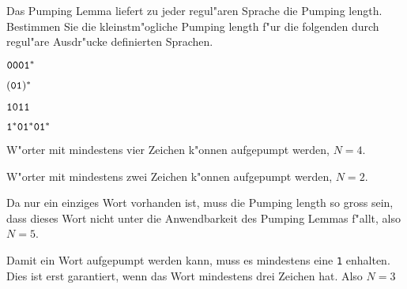 Das Pumping Lemma liefert zu jeder regul"aren Sprache die Pumping length.
Bestimmen Sie die kleinstm"ogliche Pumping length f"ur die folgenden
durch regul"are Ausdr"ucke definierten Sprachen.
\begin{teilaufgaben}
\item ${\tt 0001}^*$
\item $({\tt 01})^*$
\item ${\tt 1011}$
\item ${\tt 1}^*{\tt 01}^*{\tt 01}^*$
\end{teilaufgaben}

\begin{loesung}
\begin{teilaufgaben}
\item W"orter mit mindestens vier Zeichen k"onnen aufgepumpt werden,
$N=4$.
\item W"orter mit mindestens zwei Zeichen k"onnen aufgepumpt werden,
$N=2$.
\item Da nur ein einziges Wort vorhanden ist, muss die Pumping length
so gross sein, dass dieses Wort nicht unter die Anwendbarkeit des
Pumping Lemmas f"allt, also $N=5$.
\item Damit ein Wort aufgepumpt werden kann, muss es mindestens eine
{\tt 1} enhalten. Dies ist erst garantiert, wenn das Wort  mindestens
drei Zeichen hat. Also $N=3$
\end{teilaufgaben}
\end{loesung}

